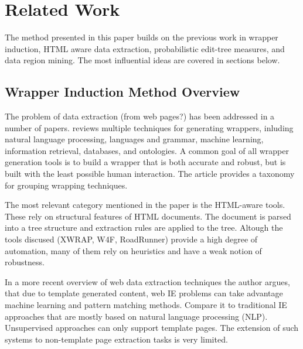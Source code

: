 \chapter{Related Work}




The method presented in this paper builds on the previous work in wrapper induction, HTML aware data extraction, probabilistic edit-tree measures, and data region mining. The most influential ideas are covered in sections below.


\section{Wrapper Induction Method Overview}

The problem of data extraction (from web pages?) has been addressed in a number of papers. \cite{Laender:2002:BSW:565117.565137} reviews multiple techniques for generating wrappers, inluding natural language processing, languages and grammar, machine learning, information retrieval, databases, and ontologies. A common goal of all wrapper generation tools is to build a wrapper that is both accurate and robust, but is built with the least possible human interaction. The article provides a taxonomy for grouping wrapping techniques.

The most relevant category mentioned in the paper is the HTML-aware tools. These rely on structural features of HTML documents. The document is parsed into a tree structure and extraction rules are applied to the tree. Altough the tools discused (XWRAP, W4F, RoadRunner) provide a high degree of automation, many of them rely on heuristics and have a weak notion of robustness.

In a more recent overview of web data extraction techniques \cite{Chang:2006:SWI:1159162.1159300} the author argues, that due to template generated content, web IE problems can take advantage machine learning and pattern matching methods. Compare it to traditional IE approaches that are mostly based on natural language processing (NLP). Unsupervised approaches can only support template pages. The extension of such systems to non-template page extraction tasks is very limited.

